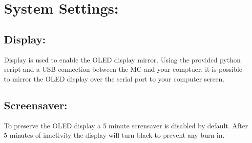 \section{System Settings:}
\subsection{Display:}
Display is used to enable the OLED display mirror. Using the provided python script and a USB connection between the MC and your comptuer, it is possible to mirror the OLED display over the serial port to your computer screen.
\subsection{Screensaver:}
To preserve the OLED display a 5 minute scrensaver is disabled by default. After 5 minutes of inactivity the display will turn black to prevent any burn in.
